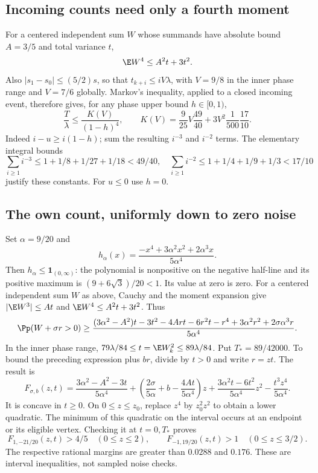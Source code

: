 \subsection{Incoming counts need only a fourth moment}
For a centered independent sum $W$ whose summands have absolute bound
$A=3/5$ and total variance $t$,
\[
                  \E W^4\le A^2t+3t^2.
\]
Also $|s_1-s_0|\le(5/2)s$, so that
$t_{k+i}\le iV\lambda$, with $V=9/8$ in the inner phase range and
$V=7/6$ globally. Markov's inequality, applied to a closed incoming event,
therefore gives, for any phase upper bound $h\in[0,1)$,
\begin{equation}\label{v10:smallnoise:tails}
 \frac{T}{\lambda}\le\frac{K(V)}{(1-h)^4},\qquad
 K(V)=\frac9{25}V\frac{49}{40}
                         +3V^2\frac1{500}\frac{17}{10}.
\end{equation}
Indeed $i-u\ge i(1-h)$; sum the resulting $i^{-3}$ and $i^{-2}$ terms.
The elementary integral bounds
\[
 \sum_{i\ge1}i^{-3}\le1+1/8+1/27+1/18<49/40,
 \quad
 \sum_{i\ge1}i^{-2}\le1+1/4+1/9+1/3<17/10
\]
justify these constants. For $u\le0$ use $h=0$.

\subsection{The own count, uniformly down to zero noise}
Set $\alpha=9/20$ and
\[
 h_\alpha(x)=\frac{-x^4+3\alpha^2x^2+2\alpha^3x}{5\alpha^4}.
\]
Then $h_\alpha\le\mathbf1_{(0,\infty)}$: the polynomial is nonpositive
on the negative half-line and its positive maximum is
$(9+6\sqrt3)/20<1$. Its value at zero is zero. For a centered independent
sum $W$ as above, Cauchy and the moment expansion give
$|\E W^3|\le At$ and $\E W^4\le A^2t+3t^2$. Thus
\[
 \Pp(W+\sigma r>0)\ge
 \frac{(3\alpha^2-A^2)t-3t^2-4Art-6r^2t-r^4
                         +3\alpha^2r^2+2\sigma\alpha^3r}{5\alpha^4}.
\]
In the inner phase range,
$79\lambda/84\le t=\E W_k^2\le89\lambda/84$.
Put $T_*=89/42000$. To bound the preceding expression plus $br$, divide
by $t>0$ and write $r=zt$. The result is
\[
 F_{\sigma,b}(z,t)=\frac{3\alpha^2-A^2-3t}{5\alpha^4}
 +\left(\frac{2\sigma}{5\alpha}+b-\frac{4At}{5\alpha^4}\right)z
 +\frac{3\alpha^2t-6t^2}{5\alpha^4}z^2
 -\frac{t^3z^4}{5\alpha^4}.
\]
It is concave in $t\ge0$. On $0\le z\le z_0$, replace $z^4$ by
$z_0^2z^2$ to obtain a lower quadratic. The minimum of this quadratic
on the interval occurs at an endpoint or its eligible vertex. Checking
it at $t=0,T_*$ proves
\[
 F_{1,-21/20}(z,t)>4/5\quad(0\le z\le2),\qquad
 F_{-1,19/20}(z,t)>1\quad(0\le z\le3/2).
\]
The respective rational margins are greater than $0.0288$ and $0.176$.
These are interval inequalities, not sampled noise checks.

